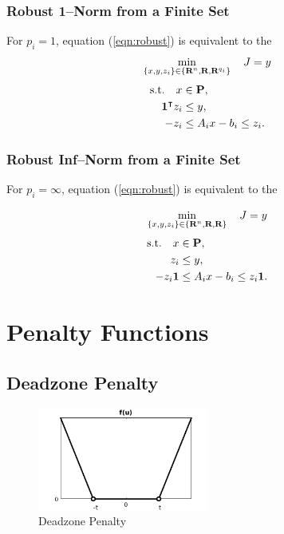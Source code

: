 \documentclass{article}
\begin{document}
\subsubsection{Robust 1--Norm from a Finite Set}

        For $p_i=1$, equation (\ref{eqn:robust}) is equivalent to the \LP
        \begin{align*}
            \min_{\{x,y,z_i\}\in\{\textbf{R}^n,\textbf{R},\textbf{R}^{q_i}\}} \quad J =y
        \end{align*}
        \begin{align*}
            \text{s.t.}\quad x&\in\textbf{P},\\
            \textbf{1}^\intercal z_i&\leq y,\\
            -z_i&\leq A_ix-b_i\leq z_i.
        \end{align*}

\subsubsection{Robust Inf--Norm from a Finite Set}

        For $p_i=\infty$, equation (\ref{eqn:robust}) is equivalent to the \LP

        \begin{align*}
            \min_{\{x,y,z_i\}\in\{\textbf{R}^n,\textbf{R},\textbf{R}\}} \quad J =y
        \end{align*}
        \begin{align*}
            \text{s.t.}\quad x&\in\textbf{P},\\
            z_i&\leq y,\\
            -z_i\textbf{1} &\leq A_ix-b_i\leq z_i\textbf{1}.
        \end{align*}


    \clearpage

\section{Penalty Functions}

    \subsection{Deadzone Penalty} 

    \begin{figure}[h!]
        \centering
        \includegraphics[width=0.5\textwidth]{./figs/norm/deadzone.png}
        \caption{Deadzone Penalty}
        \label{fig:deadzone}
    \end{figure}
\end{document}
